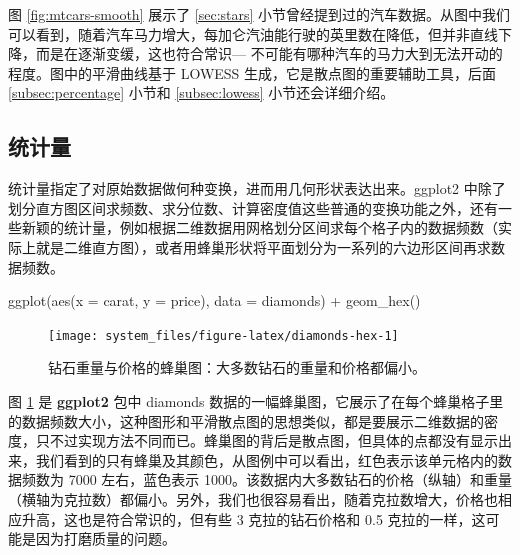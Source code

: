 \documentclass[
  b5paper,
  UTF8,twoside]{book}
\newenvironment{Shaded}{\begin{snugshade}}{\end{snugshade}}
\newcommand{\AttributeTok}[1]{\textcolor[rgb]{0.77,0.63,0.00}{#1}}
\newcommand{\FunctionTok}[1]{\textcolor[rgb]{0.00,0.00,0.00}{#1}}
\newcommand{\NormalTok}[1]{#1}
\newcommand{\SpecialCharTok}[1]{\textcolor[rgb]{0.00,0.00,0.00}{#1}}
\begin{document}
图 \ref{fig:mtcars-smooth} 展示了 \ref{sec:stars} 小节曾经提到过的汽车数据。从图中我们可以看到，随着汽车马力增大，每加仑汽油能行驶的英里数在降低，但并非直线下降，而是在逐渐变缓，这也符合常识--- 不可能有哪种汽车的马力大到无法开动的程度。图中的平滑曲线基于 LOWESS 生成，它是散点图的重要辅助工具，后面 \ref{subsec:percentage} 小节和 \ref{subsec:lowess} 小节还会详细介绍。

\hypertarget{ux7edfux8ba1ux91cf}{%
\subsection{统计量}\label{ux7edfux8ba1ux91cf}}

统计量指定了对原始数据做何种变换，进而用几何形状表达出来。ggplot2 中除了划分直方图区间求频数、求分位数、计算密度值这些普通的变换功能之外，还有一些新颖的统计量，例如根据二维数据用网格划分区间求每个格子内的数据频数（实际上就是二维直方图），或者用蜂巢形状将平面划分为一系列的六边形区间再求数据频数。

\begin{Shaded}
\begin{Highlighting}[]
\FunctionTok{ggplot}\NormalTok{(}\FunctionTok{aes}\NormalTok{(}\AttributeTok{x =}\NormalTok{ carat, }\AttributeTok{y =}\NormalTok{ price), }\AttributeTok{data =}\NormalTok{ diamonds) }\SpecialCharTok{+}
  \FunctionTok{geom\_hex}\NormalTok{()}
\end{Highlighting}
\end{Shaded}

\begin{figure}

{\centering \texttt{[image: system\_files/figure-latex/diamonds-hex-1]} 

}

\caption[钻石重量与价格的蜂巢图]{钻石重量与价格的蜂巢图：大多数钻石的重量和价格都偏小。}\label{fig:diamonds-hex}
\end{figure}





图 \ref{fig:diamonds-hex} 是 \textbf{ggplot2} 包中 diamonds 数据的一幅蜂巢图，它展示了在每个蜂巢格子里的数据频数大小，这种图形和平滑散点图的思想类似，都是要展示二维数据的密度，只不过实现方法不同而已。蜂巢图的背后是散点图，但具体的点都没有显示出来，我们看到的只有蜂巢及其颜色，从图例中可以看出，红色表示该单元格内的数据频数为 7000 左右，蓝色表示 1000。该数据内大多数钻石的价格（纵轴）和重量（横轴为克拉数）都偏小。另外，我们也很容易看出，随着克拉数增大，价格也相应升高，这也是符合常识的，但有些 3 克拉的钻石价格和 0.5 克拉的一样，这可能是因为打磨质量的问题。
\end{document}
